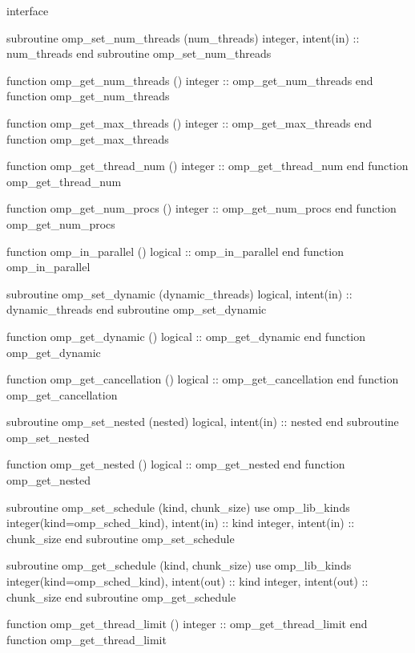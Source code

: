 {\begin{ompfFunction}
         interface

          subroutine omp_set_num_threads (num_threads)
           integer, intent(in) :: num_threads
          end subroutine omp_set_num_threads

          function omp_get_num_threads ()
           integer :: omp_get_num_threads
          end function omp_get_num_threads

          function omp_get_max_threads ()
           integer :: omp_get_max_threads
          end function omp_get_max_threads

          function omp_get_thread_num ()
           integer :: omp_get_thread_num
          end function omp_get_thread_num

          function omp_get_num_procs ()
           integer :: omp_get_num_procs
          end function omp_get_num_procs

          function omp_in_parallel ()
           logical :: omp_in_parallel
          end function omp_in_parallel

          subroutine omp_set_dynamic (dynamic_threads)
           logical, intent(in) :: dynamic_threads
          end subroutine omp_set_dynamic

          function omp_get_dynamic ()
           logical :: omp_get_dynamic
          end function omp_get_dynamic

          function omp_get_cancellation ()
           logical :: omp_get_cancellation
          end function omp_get_cancellation

          subroutine omp_set_nested (nested)
           logical, intent(in) :: nested
          end subroutine omp_set_nested

          function omp_get_nested ()
           logical :: omp_get_nested
          end function omp_get_nested

          subroutine omp_set_schedule (kind, chunk_size)
           use omp_lib_kinds
           integer(kind=omp_sched_kind), intent(in) :: kind
           integer, intent(in) :: chunk_size
          end subroutine omp_set_schedule

          subroutine omp_get_schedule (kind, chunk_size)
           use omp_lib_kinds
           integer(kind=omp_sched_kind), intent(out) :: kind
           integer, intent(out) :: chunk_size
          end subroutine omp_get_schedule

          function omp_get_thread_limit ()
           integer :: omp_get_thread_limit
          end function omp_get_thread_limit


\end{ompfFunction}}
